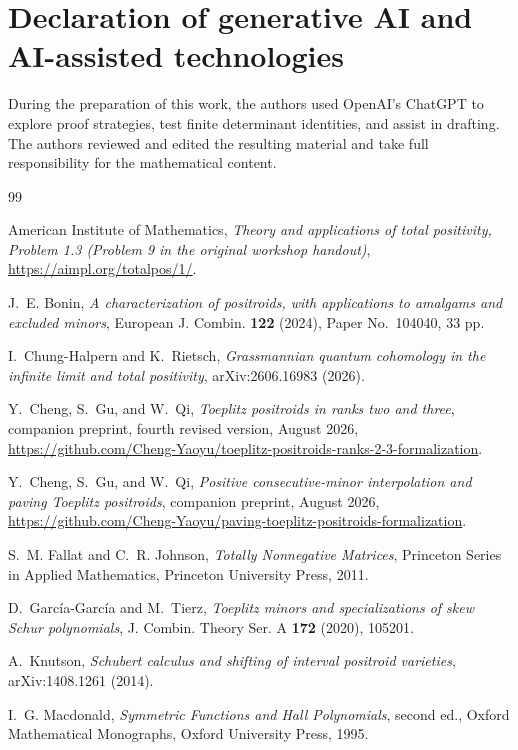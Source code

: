 \documentclass[11pt]{amsart}
\theoremstyle{definition}
\theoremstyle{remark}
\begin{document}
\section*{Declaration of generative AI and AI-assisted technologies}
During the preparation of this work, the authors used OpenAI's ChatGPT to explore proof strategies, test finite determinant identities, and assist in drafting.  The authors reviewed and edited the resulting material and take full responsibility for the mathematical content.

\begin{thebibliography}{99}

American Institute of Mathematics,
\emph{Theory and applications of total positivity, Problem 1.3 (Problem 9 in the original workshop handout)},
\url{https://aimpl.org/totalpos/1/}.

J.~E. Bonin,
\emph{A characterization of positroids, with applications to amalgams and excluded minors},
European J. Combin. \textbf{122} (2024), Paper No.~104040, 33 pp.

I.~Chung-Halpern and K.~Rietsch,
\emph{Grassmannian quantum cohomology in the infinite limit and total positivity},
arXiv:2606.16983 (2026).

Y.~Cheng, S.~Gu, and W.~Qi,
\emph{Toeplitz positroids in ranks two and three},
companion preprint, fourth revised version, August 2026,
\url{https://github.com/Cheng-Yaoyu/toeplitz-positroids-ranks-2-3-formalization}.

Y.~Cheng, S.~Gu, and W.~Qi,
\emph{Positive consecutive-minor interpolation and paving Toeplitz positroids},
companion preprint, August 2026,
\url{https://github.com/Cheng-Yaoyu/paving-toeplitz-positroids-formalization}.

S.~M. Fallat and C.~R. Johnson,
\emph{Totally Nonnegative Matrices},
Princeton Series in Applied Mathematics, Princeton University Press, 2011.

D.~Garc\'ia-Garc\'ia and M.~Tierz,
\emph{Toeplitz minors and specializations of skew Schur polynomials},
J. Combin. Theory Ser. A \textbf{172} (2020), 105201.

A.~Knutson,
\emph{Schubert calculus and shifting of interval positroid varieties},
arXiv:1408.1261 (2014).

I.~G. Macdonald,
\emph{Symmetric Functions and Hall Polynomials}, second ed.,
Oxford Mathematical Monographs, Oxford University Press, 1995.


\end{thebibliography}
\end{document}
